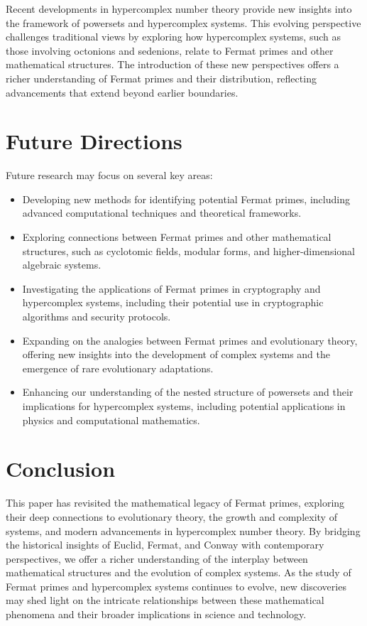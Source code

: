 \documentclass[12pt]{article}
\begin{document}
Recent developments in hypercomplex number theory provide new insights into the framework of powersets and hypercomplex systems. This evolving perspective challenges traditional views by exploring how hypercomplex systems, such as those involving octonions and sedenions, relate to Fermat primes and other mathematical structures. The introduction of these new perspectives offers a richer understanding of Fermat primes and their distribution, reflecting advancements that extend beyond earlier boundaries.

\section{Future Directions}

Future research may focus on several key areas:

\begin{itemize}
    \item Developing new methods for identifying potential Fermat primes, including advanced computational techniques and theoretical frameworks.
    \item Exploring connections between Fermat primes and other mathematical structures, such as cyclotomic fields, modular forms, and higher-dimensional algebraic systems.
    \item Investigating the applications of Fermat primes in cryptography and hypercomplex systems, including their potential use in cryptographic algorithms and security protocols.
    \item Expanding on the analogies between Fermat primes and evolutionary theory, offering new insights into the development of complex systems and the emergence of rare evolutionary adaptations.
    \item Enhancing our understanding of the nested structure of powersets and their implications for hypercomplex systems, including potential applications in physics and computational mathematics.
\end{itemize}

\section{Conclusion}

This paper has revisited the mathematical legacy of Fermat primes, exploring their deep connections to evolutionary theory, the growth and complexity of systems, and modern advancements in hypercomplex number theory. By bridging the historical insights of Euclid, Fermat, and Conway with contemporary perspectives, we offer a richer understanding of the interplay between mathematical structures and the evolution of complex systems. As the study of Fermat primes and hypercomplex systems continues to evolve, new discoveries may shed light on the intricate relationships between these mathematical phenomena and their broader implications in science and technology.
\end{document}
